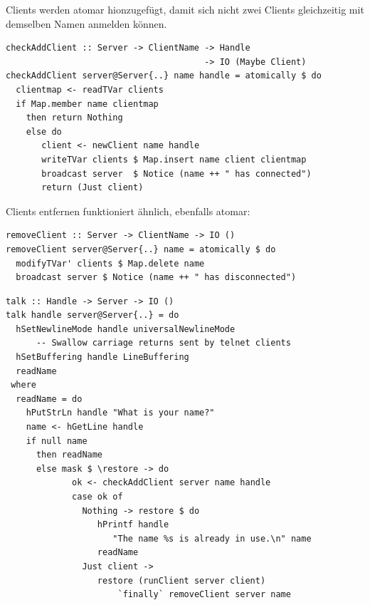 \documentclass{beamer}
\begin{document}

\begin{frame}[fragile]

Clients werden atomar hionzugefügt, damit sich nicht zwei Clients gleichzeitig
mit demselben Namen anmelden können.

\begin{verbatim}
checkAddClient :: Server -> ClientName -> Handle
                                       -> IO (Maybe Client)
checkAddClient server@Server{..} name handle = atomically $ do
  clientmap <- readTVar clients
  if Map.member name clientmap
    then return Nothing
    else do 
       client <- newClient name handle
       writeTVar clients $ Map.insert name client clientmap
       broadcast server  $ Notice (name ++ " has connected")
       return (Just client)
\end{verbatim}
\end{frame}


\begin{frame}[fragile]

Clients entfernen funktioniert ähnlich, ebenfalls atomar:

\begin{verbatim}
removeClient :: Server -> ClientName -> IO ()
removeClient server@Server{..} name = atomically $ do
  modifyTVar' clients $ Map.delete name
  broadcast server $ Notice (name ++ " has disconnected")
\end{verbatim}
\end{frame}


\begin{frame}[fragile]

\begin{verbatim}
talk :: Handle -> Server -> IO ()
talk handle server@Server{..} = do
  hSetNewlineMode handle universalNewlineMode
      -- Swallow carriage returns sent by telnet clients
  hSetBuffering handle LineBuffering
  readName
 where
  readName = do
    hPutStrLn handle "What is your name?"
    name <- hGetLine handle
    if null name
      then readName
      else mask $ \restore -> do
             ok <- checkAddClient server name handle
             case ok of
               Nothing -> restore $ do
                  hPrintf handle
                     "The name %s is already in use.\n" name
                  readName
               Just client ->
                  restore (runClient server client)
                      `finally` removeClient server name
\end{verbatim}
\end{frame}
\end{document}
